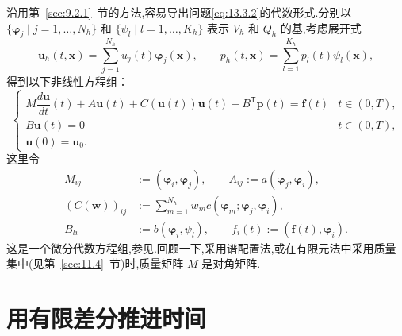 沿用第~\ref{sec:9.2.1}~节的方法,容易导出问题\eqref{eq:13.3.2}的代数形式.分别以 \(\{\boldsymbol{\varphi}_j\mid j=1,\ldots,N_h\}\) 和 \(\{\psi_l\mid l=1,\ldots,K_h\}\) 表示 \(V_h\) 和 \(Q_h\) 的基,考虑展开式
\[
  \boldsymbol{u}_h(t,\boldsymbol{x})=\sum_{j=1}^{N_h}u_j(t)\boldsymbol{\varphi}_j(\boldsymbol{x}),\qquad
  p_h(t,\boldsymbol{x})=\sum_{l=1}^{K_h}p_l(t)\psi_l(\boldsymbol{x}),
\]
得到以下非线性方程组：
\begin{equation}\label{eq:13.3.10}
  \begin{cases}
    M\dfrac{d\boldsymbol{u}}{dt}(t)+A\boldsymbol{u}(t)
      +C(\boldsymbol{u}(t))\boldsymbol{u}(t)+B^{\mathsf T}\boldsymbol{p}(t)=\boldsymbol{f}(t)
       & t\in(0,T),\\[2pt]
    B\boldsymbol{u}(t)=0 & t\in(0,T),\\
    \boldsymbol{u}(0)=\boldsymbol{u}_0.
  \end{cases}
\end{equation}
这里令
\begin{equation}\label{eq:13.3.11}
  \begin{aligned}
    M_{ij}&:=(\boldsymbol{\varphi}_i,\boldsymbol{\varphi}_j),\qquad
    A_{ij}:=a(\boldsymbol{\varphi}_j,\boldsymbol{\varphi}_i),\\
    (C(\boldsymbol{w}))_{ij}&:=\sum_{m=1}^{N_h}w_m
        c(\boldsymbol{\varphi}_m;\boldsymbol{\varphi}_j,\boldsymbol{\varphi}_i),\\
    B_{li}&:=b(\boldsymbol{\varphi}_i,\psi_l),\qquad
    f_i(t):=(\boldsymbol{f}(t),\boldsymbol{\varphi}_i).
  \end{aligned}
\end{equation}
这是一个微分代数方程组,参见.回顾一下,采用谱配置法,或在有限元法中采用质量集中(见第~\ref{sec:11.4}~节)时,质量矩阵 \(M\) 是对角矩阵.

\section{用有限差分推进时间}\label{sec:13.4}

